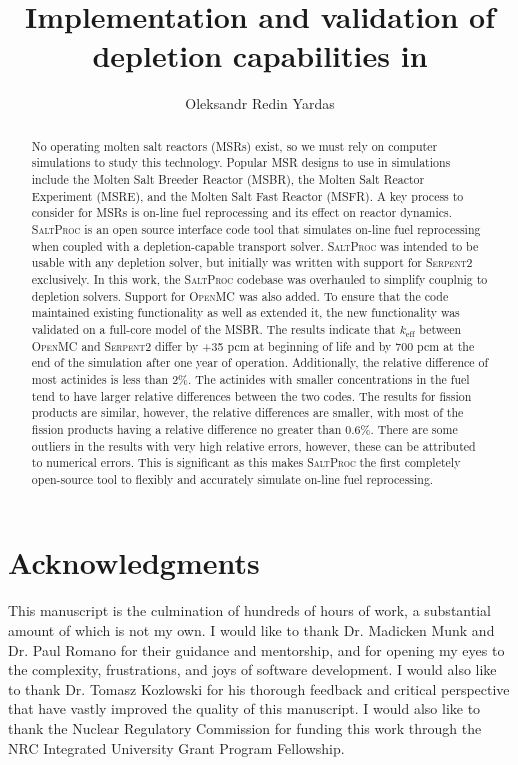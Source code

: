 \documentclass[edeposit,fullpage,hidelinks]{uiucthesis2018}
\title{Implementation and validation of \OpenMC depletion capabilities in \SaltProc}
\author{Oleksandr Redin Yardas}
\newcommand{\SaltProc}{\textsc{SaltProc}\xspace}
\newcommand{\OpenMC}{\textsc{OpenMC}\xspace}
\newcommand{\SerpentTWO}{\textsc{Serpent2}\xspace}
\begin{document}

\maketitle

\frontmatter
\begin{abstract}
No operating molten salt reactors (MSRs) exist, so we must rely on computer simulations
to study this technology. Popular MSR designs to use in simulations
include the Molten Salt Breeder Reactor (MSBR), the Molten Salt Reactor Experiment
(MSRE), and the Molten Salt Fast Reactor (MSFR). A key process to
consider for MSRs is on-line fuel reprocessing and its effect on reactor
dynamics. \SaltProc is an open source interface code tool that simulates on-line
fuel reprocessing when coupled with a depletion-capable transport solver.
\SaltProc was intended to be usable with any depletion solver, but initially was written
with support for \SerpentTWO exclusively. In this work, the \SaltProc codebase was overhauled
to simplify couplnig to depletion solvers. Support for \OpenMC was also added.
To ensure that the code maintained existing functionality as well as extended it, the new
functionality was validated on a full-core model of the MSBR. The results indicate that
$k_\text{eff}$ between \OpenMC and \SerpentTWO differ by +35 pcm at beginning of life
and by 700 pcm at the end of the simulation after one year of operation. Additionally,
the relative difference of most actinides is less than 2\%. The actinides
with smaller concentrations in the fuel tend to have larger relative differences
between the two codes. The results for fission products are similar, however, the 
relative differences are smaller, with most of the fission products having a
relative difference no greater than 0.6\%. There are some outliers in the results
with very high relative errors, however, these can be attributed to numerical errors.
This is significant as this makes \SaltProc the first completely open-source tool to
flexibly and accurately simulate on-line fuel reprocessing.
\end{abstract}

\chapter*{Acknowledgments}

This manuscript is the culmination of hundreds of hours of work, a substantial
amount of which is not my own. I would like to thank Dr. Madicken Munk and Dr.
Paul Romano for their guidance and mentorship, and for opening my eyes to the
complexity, frustrations, and joys of software development. I would also like to
thank Dr. Tomasz Kozlowski for his thorough feedback and critical perspective
that have vastly improved the quality of this manuscript. I would also like to
thank the Nuclear Regulatory Commission for funding this work through the NRC
Integrated University Grant Program Fellowship.
\end{document}

